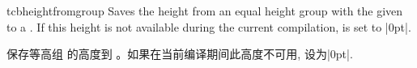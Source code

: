 \begin{docCommand}[doc new=2015-11-27]{tcbheightfromgroup}{}
Saves the height from an equal height group with the given 
to a . If this height is not available during the current compilation,
 is set to |0pt|.

保存等高组  的高度到 。如果在当前编译期间此高度不可用,
 设为|0pt|.
\end{docCommand}